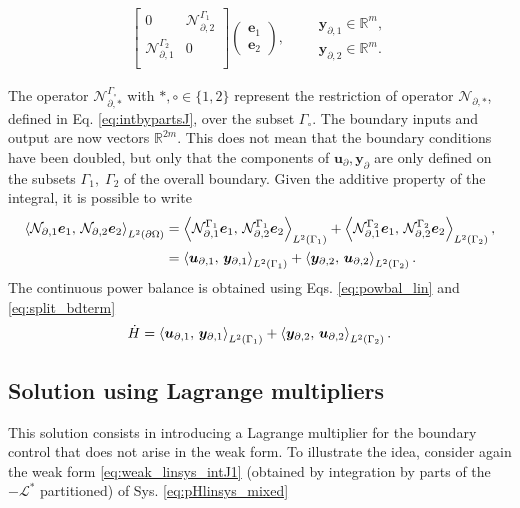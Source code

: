 \begin{subequations}
\begin{align}
\begin{bmatrix}
0 & \mathcal{N}_{\partial, 2}^{\Gamma_1} \\
\mathcal{N}_{\partial, 1}^{\Gamma_2} & 0\\
\end{bmatrix} \begin{pmatrix}
\bm{e}_1 \\ \bm{e}_2
\end{pmatrix}, \qquad
\begin{aligned}
\bm{y}_{\partial, 1} \in \mathbb{R}^{m},\\
\bm{y}_{\partial, 2} \in \mathbb{R}^{m}.
\end{aligned}
\end{align}
\end{subequations}

 The operator $\mathcal{N}_{\partial, *}^{\Gamma_\circ}$ with $*, \circ \in \{1, 2\}$ represent the restriction of operator $\mathcal{N}_{\partial, *}$, defined in Eq. \eqref{eq:intbypartsJ}, over the subset $\Gamma_\circ$. The boundary inputs and output are now vectors $\mathbb{R}^{2m}$. This does not mean that the boundary conditions have been doubled, but only that the components of $\bm{u}_\partial, \bm{y}_\partial$ are only defined on the subsets $\Gamma_1, \; \Gamma_2$ of the overall boundary. Given the additive property of the integral, it is possible to write
\begin{equation}\label{eq:split_bdterm}
\begin{aligned}
\inner[L^2(\partial \Omega)]{\mathcal{N}_{\partial, 1}\bm{e}_1}{\mathcal{N}_{\partial, 2}\bm{e}_2} &= \inner[L^2(\Gamma_1)]{\mathcal{N}_{\partial, 1}^{\Gamma_1}\bm{e}_1}{\mathcal{N}_{\partial, 2}^{\Gamma_1}\bm{e}_2} + \inner[L^2({\Gamma_2})]{\mathcal{N}_{\partial, 1}^{\Gamma_2}\bm{e}_1}{\mathcal{N}_{\partial, 2}^{\Gamma_2}\bm{e}_2}, \\
&= \inner[L^2({\Gamma_1})]{\bm{u}_{\partial, 1}}{\bm{y}_{\partial, 1}} + \inner[L^2({\Gamma_2})]{\bm{y}_{\partial, 2}}{\bm{u}_{\partial, 2}}.
\end{aligned} 
\end{equation}
The continuous power balance is obtained using Eqs. \eqref{eq:powbal_lin} and \eqref{eq:split_bdterm}
\begin{equation}\label{eq:powbal_mixed}
	\dot{H} = \inner[L^2({\Gamma_1})]{\bm{u}_{\partial, 1}}{\bm{y}_{\partial, 1}} + \inner[L^2({\Gamma_2})]{\bm{y}_{\partial, 2}}{\bm{u}_{\partial, 2}}.
\end{equation}
 

\subsection{Solution using Lagrange multipliers}\label{sec:lagrMul}
This solution consists in introducing a Lagrange multiplier for the boundary control that does not arise in the weak form. To illustrate the idea, consider again the weak form \ref{eq:weak_linsys_intJ1} (obtained by integration by parts of the $\mathcal{-L^*}$ partitioned) of Sys. \ref{eq:pHlinsys_mixed}

